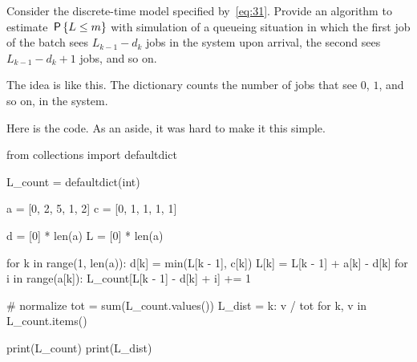 \begin{exercise}\label{ex:l-166} 
Consider 
 the discrete-time model specified by~\cref{eq:31}.
Provide 
an algorithm to estimate  $\,\mathsf{P}\left\{L\leq m\right\}$ with  simulation of a queueing situation in which  the first job of the batch sees $L_{k-1} - d_k$ jobs in the system upon arrival, 
the second sees $L_{k-1}-d_k + 1$ jobs, and so on.

\begin{solution} 
The idea is like this. The dictionary  counts the number of jobs that see $0$, $1$, and so on, in the system. 

Here is the code. As an aside, it was hard to make it this simple. 
\begin{pyconsole}
from collections import defaultdict

L_count = defaultdict(int)

a = [0, 2, 5, 1, 2]
c = [0, 1, 1, 1, 1]

d = [0] * len(a)
L = [0] * len(a)

for k in range(1, len(a)):
    d[k] = min(L[k - 1], c[k])
    L[k] = L[k - 1] + a[k] - d[k]
    for i in range(a[k]):
        L_count[L[k - 1] - d[k] + i] += 1


# normalize
tot = sum(L_count.values())
L_dist = {k: v / tot for k, v in L_count.items()}

print(L_count)
print(L_dist)
\end{pyconsole}

\end{solution}
\end{exercise}




